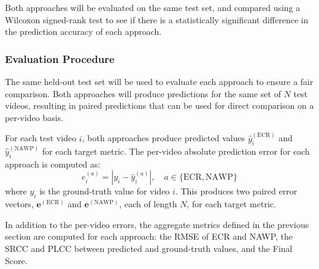 Both approaches will be evaluated on the same test set, and compared using a Wilcoxon signed-rank test to see if there is a statistically significant difference in the prediction accuracy of each approach. 

\subsubsection{Evaluation Procedure}

The same held-out test set will be used to evaluate each approach to ensure a fair comparison. Both approaches will produce predictions for the same set of $N$ test videos, resulting in paired predictions that can be used for direct comparison on a per-video basis.

For each test video $i$, both approaches produce predicted values $\hat{y}_i^{(\text{ECR})}$ and $\hat{y}_i^{(\text{NAWP})}$ for each target metric. The per-video absolute prediction error for each approach is computed as:
\begin{equation}
    e_i^{(a)} = |y_i - \hat{y}_i^{(a)}|, \quad a \in \{\text{ECR}, \text{NAWP}\}
\end{equation}
where $y_i$ is the ground-truth value for video $i$. This produces two paired error vectors, $\mathbf{e}^{(\text{ECR})}$ and $\mathbf{e}^{(\text{NAWP})}$, each of length $N$, for each target metric.


In addition to the per-video errors, the aggregate metrics defined in the previous section are computed for each approach: the RMSE of ECR and NAWP, the SRCC and PLCC between predicted and ground-truth values, and the Final Score.

